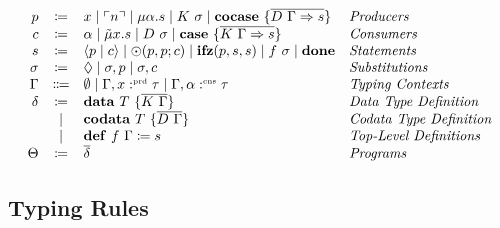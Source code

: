 \begin{definition}
    \[
      \begin{array}{rcll}
        p & \coloneqq & x \mid \lit{n} \mid \mu\alpha.s \mid K\ \sigma \mid \cocase{\overline{D\ \Gamma \Rightarrow s}} & \emph{Producers}\\
        c & \coloneqq & \alpha \mid \tilde{\mu}x.s \mid D\ \sigma \mid \case{\overline{K\ \Gamma \Rightarrow s}}& \emph{Consumers}\\
        s & \coloneqq & \cut{p}{c} \mid \odot(p, p; c) \mid \ifz{p}{s}{s} \mid f\ \sigma\mid \done & \emph{Statements}\\
        \sigma & \coloneqq & \nil \mid \sigma, p \mid \sigma, c & \emph{Substitutions}\\
        \Gamma & \Coloneqq & \emptyset \mid \Gamma, x \prd \tau \mid \Gamma, \alpha \cnt \tau & \emph{Typing Contexts} \\
        \delta & \coloneqq & \mathbf{data}\ T\ \{ \overline{K\ \Gamma} \} & \emph{Data Type Definition}\\
        & \mid & \mathbf{codata}\ T\ \{ \overline{D\ \Gamma }\} & \emph{Codata Type Definition}\\
        & \mid & \defi{f\ \Gamma}{s} & \emph{Top-Level Definitions}\\
       \Theta & \coloneqq & \overline{\delta} & \emph{Programs}\\
     \end{array}
    \]
  \end{definition}

\subsection{Typing Rules}
\label{subsec:core:typing-rules}

